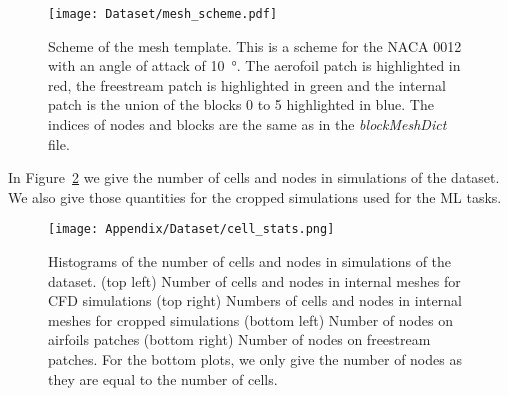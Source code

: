 \begin{subappendices}
	\begin{figure}
		\centering
		\texttt{[image: Dataset/mesh\_scheme.pdf]}
		\caption[Scheme of the mesh template.]{Scheme of the mesh template. This is a scheme for the \acrshort{NACA} 0012 with an angle of attack of \SI{10}{\degree}. The aerofoil patch is highlighted in red, the freestream patch is highlighted in green and the internal patch is the union of the blocks 0 to 5 highlighted in blue. The indices of nodes and blocks are the same as in the \emph{blockMeshDict} file.}
		\label{fig:sch_mesh}
	\end{figure}
	
	In Figure~\ref{fig:data_stats} we give the number of cells and nodes in simulations of the dataset. We also give those quantities for the cropped simulations used for the \acrshort{ML} tasks.
	
	\begin{figure}
		\centering
		\texttt{[image: Appendix/Dataset/cell\_stats.png]}
		\caption[Histograms of the number of cells and nodes in simulations of the dataset.]{Histograms of the number of cells and nodes in simulations of the dataset. (top left) Number of cells and nodes in internal meshes for \acrshort{CFD} simulations (top right) Numbers of cells and nodes in internal meshes for cropped simulations (bottom left) Number of nodes on airfoils patches (bottom right) Number of nodes on freestream patches. For the bottom plots, we only give the number of nodes as they are equal to the number of cells.}
		\label{fig:data_stats}
	\end{figure}
	

\end{subappendices}
